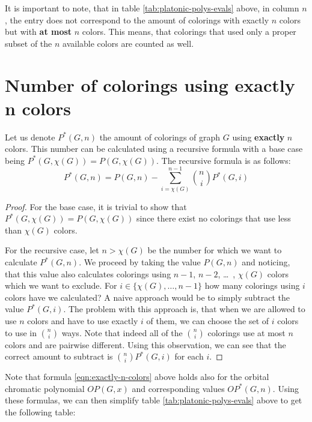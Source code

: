 \begin{highlight}
It is important to note, that in table \ref{tab:platonic-polys-evals} above, in column $n$, the entry does not correspond to the amount of colorings with exactly $n$ colors but with \textbf{at most} $n$ colors. This means, that colorings that used only a proper subset of the $n$ available colors are counted as well.

\section{Number of colorings using exactly n colors}

Let us denote $P^*(G,n)$ the amount of colorings of graph $G$ using \textbf{exactly} $n$ colors. This number can be calculated using a recursive formula with a base case being $P^*(G,\chi(G))=P(G,\chi(G))$. The recursive formula is as follows:
\begin{equation}\label{eqn:exactly-n-colors}
P^*(G,n) = P(G,n) - \sum_{i=\chi(G)}^{n-1}\binom{n}{i}P^*(G,i)    
\end{equation}

\begin{proof}
    For the base case, it is trivial to show that $P^*(G,\chi(G))=P(G,\chi(G))$ since there exist no colorings that use less than $\chi(G)$ colors.
    
    For the recursive case, let $n>\chi(G)$ be the number for which we want to calculate $P^*(G,n)$. We proceed by taking the value $P(G,n)$ and noticing, that this value also calculates colorings using $n-1$, $n-2$, \ldots \ , $\chi(G)$ colors which we want to exclude. For $i \in \{\chi(G),\ldots,n-1\}$ how many colorings using $i$ colors have we calculated? A naive approach would be to simply subtract the value $P^*(G,i)$. The problem with this approach is, that when we are allowed to use $n$ colors and have to use exactly $i$ of them, we can choose the set of $i$ colors to use in $\binom{n}{i}$ ways. Note that indeed all of the $\binom{n}{i}$ colorings use at most $n$ colors and are pairwise different. Using this observation, we can see that the correct amount to subtract is $\binom{n}{i}P^*(G,i)$ for each $i$.
\end{proof}

Note that formula \ref{eqn:exactly-n-colors} above holds also for the orbital chromatic polynomial $OP(G,x)$ and corresponding values $OP^*(G,n)$. Using these formulas, we can then simplify table \ref{tab:platonic-polys-evals} above to get the following table:


\end{highlight}
